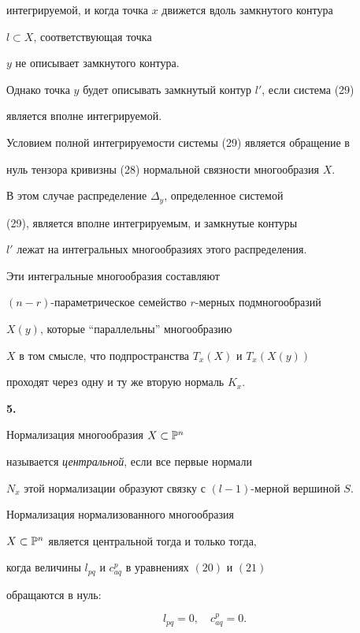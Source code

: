 интегрируемой, и когда точка $x$ движется вдоль замкнутого контура


$l \subset X$, соответствующая точка


$y$ не описывает замкнутого контура.



Однако точка $y$ будет описывать замкнутый контур $l'$, если система (29)


является вполне интегрируемой.


 Условием полной интегрируемости системы (29) является обращение в


нуль тензора кривизны (28) нормальной связности многообразия $X$.


 В этом случае распределение $\Delta_y$, определенное системой


(29), является вполне интегрируемым, и замкнутые контуры


$l'$ лежат на интегральных многообразиях этого распределения.


Эти интегральные многообразия составляют


$(n - r)$-параметрическое семейство $r$-мерных подмногообразий


$X (y)$, которые ``параллельны'' многообразию


$X$ в том смысле, что подпространства $T_x (X)$ и $T_x (X (y))$


проходят через одну и ту же вторую нормаль $K_x$.


\medskip



{\bf 5.}


Нормализация многообразия $X \subset \Bbb{P}^n$


называется {\it центральной}, если все первые нормали


$N_x$ этой нормализации образуют связку с $(l-1)$-мерной вершиной $S$.




\begin{thm}
Нормализация нормализованного многообразия


$X \subset \Bbb{P}^n$ является центральной тогда и только тогда,


когда величины $l_{pq}$ и $c^p_{aq}$ в уравнениях $(20)$ и $(21)$


обращаются в нуль\/${:}$


\begin{equation}
l_{pq} = 0, \quad c^p_{aq} = 0.
\end{equation}
\end{thm}

